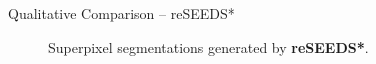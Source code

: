 \documentclass[handout]{beamer}
\begin{document}
	\begin{frame}{Qualitative Comparison -- reSEEDS*}
		\begin{figure}
   			\centering
   			\caption{Superpixel segmentations generated by \textbf{reSEEDS*}.}
   		\end{figure}
	\end{frame}
	
\end{document}
